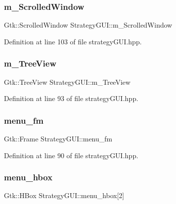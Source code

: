 \subsubsection{\texorpdfstring{m\+\_\+\+Scrolled\+Window}{m\_ScrolledWindow}}
{\footnotesize\ttfamily Gtk\+::\+Scrolled\+Window Strategy\+G\+U\+I\+::m\+\_\+\+Scrolled\+Window}



Definition at line 103 of file strategy\+G\+U\+I.\+hpp.

\mbox{\label{class_strategy_g_u_i_a8e921fa14a5dfa50b3c6df24bece55d5}} 
\subsubsection{\texorpdfstring{m\+\_\+\+Tree\+View}{m\_TreeView}}
{\footnotesize\ttfamily Gtk\+::\+Tree\+View Strategy\+G\+U\+I\+::m\+\_\+\+Tree\+View}



Definition at line 93 of file strategy\+G\+U\+I.\+hpp.

\mbox{\label{class_strategy_g_u_i_aeffa5af57b84a289f73e852ea21af347}} 
\subsubsection{\texorpdfstring{menu\+\_\+fm}{menu\_fm}}
{\footnotesize\ttfamily Gtk\+::\+Frame Strategy\+G\+U\+I\+::menu\+\_\+fm}



Definition at line 90 of file strategy\+G\+U\+I.\+hpp.

\mbox{\label{class_strategy_g_u_i_a46039c0024ff8c2ffa23d0c88d52e350}} 
\subsubsection{\texorpdfstring{menu\+\_\+hbox}{menu\_hbox}}
{\footnotesize\ttfamily Gtk\+::\+H\+Box Strategy\+G\+U\+I\+::menu\+\_\+hbox\mbox{[}2\mbox{]}}



